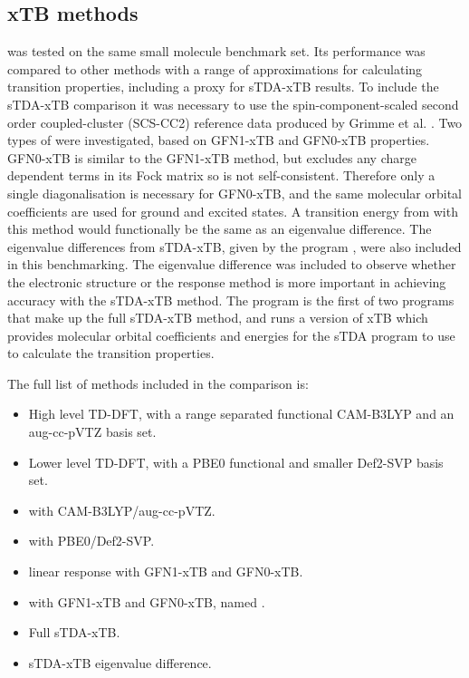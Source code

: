 \subsection{xTB methods}
\label{subsec:dscf_gfn_tests}
\dxtb was tested on the same small molecule benchmark set. Its performance was compared
to other methods with a range of approximations for calculating transition properties, 
including a proxy for sTDA-xTB results. To include the sTDA-xTB comparison it was
necessary to use the spin-component-scaled second order coupled-cluster (SCS-CC2)
\cite{Hattig2000, Hellweg2008} reference data produced by Grimme et al. \cite{Grimme2016}.
Two types of \dxtb were investigated, based on GFN1-xTB and GFN0-xTB properties.
GFN0-xTB is similar to the GFN1-xTB method, but excludes any charge dependent terms
in its Fock matrix so is not self-consistent. Therefore only a single diagonalisation
is necessary for GFN0-xTB, and the same molecular orbital coefficients are used for
ground and excited states. A transition energy from \dscf with this method would
functionally be the same as an eigenvalue difference.
The eigenvalue differences from sTDA-xTB, given by the  program
\cite{Grimme2016}, were also included in this benchmarking. The  
eigenvalue difference was included to observe whether the electronic structure or
the response method is more important in achieving accuracy with the sTDA-xTB method.
The  program is the first of two programs that make up the full sTDA-xTB
method, and runs a version of xTB which provides molecular orbital coefficients 
and energies for the sTDA program to use to calculate the transition properties.

The full list of methods included in the comparison is:
\begin{itemize}
    \item High level TD-DFT, with a range separated functional CAM-B3LYP and
     an aug-cc-pVTZ basis set.
    \item Lower level TD-DFT, with a PBE0 functional and smaller Def2-SVP basis set.
    \item \dscf with CAM-B3LYP/aug-cc-pVTZ.
    \item \dscf with PBE0/Def2-SVP.
    \item linear response with GFN1-xTB and GFN0-xTB.
    \item \dscf with GFN1-xTB and GFN0-xTB, named \dxtb.
    \item Full sTDA-xTB.
    \item sTDA-xTB eigenvalue difference.
\end{itemize}
 
